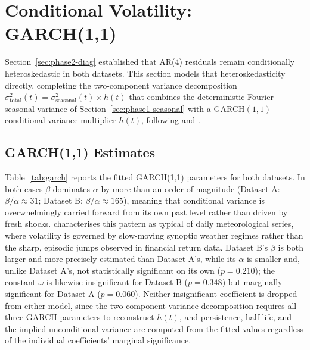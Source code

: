 \documentclass[11pt, a4paper, twoside]{article}
\begin{document}
\section{Conditional Volatility: GARCH(1,1)}
\label{sec:phase3}

Section~\ref{sec:phase2-diag} established that AR(4) residuals remain conditionally heteroskedastic in both datasets. This section models that heteroskedasticity directly, completing the two-component variance decomposition $\sigma^2_{\text{total}}(t) = \sigma^2_{\text{seasonal}}(t) \times h(t)$ that combines the deterministic Fourier seasonal variance of Section~\ref{sec:phase1-seasonal} with a GARCH$(1,1)$ conditional-variance multiplier $h(t)$, following \citet{Tol1997} and \citet{Bollerslev1986}.

\subsection{GARCH(1,1) Estimates}
\label{sec:phase3-estimates}

Table~\ref{tab:garch} reports the fitted GARCH(1,1) parameters for both datasets. In both cases $\beta$ dominates $\alpha$ by more than an order of magnitude (Dataset A: $\beta/\alpha \approx 31$; Dataset B: $\beta/\alpha \approx 165$), meaning that conditional variance is overwhelmingly carried forward from its own past level rather than driven by fresh shocks. \citet{Tol1997} characterises this pattern as typical of daily meteorological series, where volatility is governed by slow-moving synoptic weather regimes rather than the sharp, episodic jumps observed in financial return data. Dataset B's $\beta$ is both larger and more precisely estimated than Dataset A's, while its $\alpha$ is smaller and, unlike Dataset A's, not statistically significant on its own ($p = 0.210$); the constant $\omega$ is likewise insignificant for Dataset B ($p = 0.348$) but marginally significant for Dataset A ($p = 0.060$). Neither insignificant coefficient is dropped from either model, since the two-component variance decomposition requires all three GARCH parameters to reconstruct $h(t)$, and persistence, half-life, and the implied unconditional variance are computed from the fitted values regardless of the individual coefficients' marginal significance.
\end{document}
